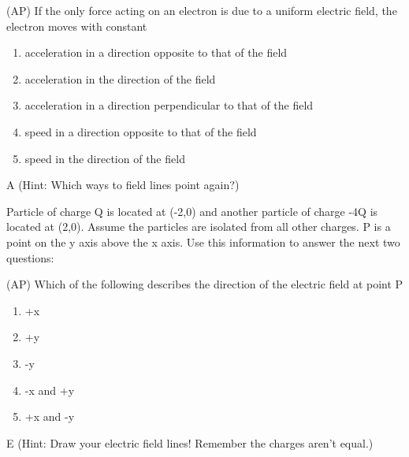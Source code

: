 \begin{question}
(AP) If the only force acting on an electron is due to a uniform electric field, the electron moves with constant
\begin{enumerate}[label=(\alph*)]
    \item acceleration in a direction opposite to that of the field
    \item acceleration in the direction of the field
    \item acceleration in a direction perpendicular to that of the field
    \item speed in a direction opposite to that of the field
    \item speed in the direction of the field
\end{enumerate}

\end{question}

\begin{solution}
A (Hint: Which ways to field lines point again?)
\end{solution}

\newpage
Particle of charge Q is located at (-2,0) and another particle of charge -4Q is located at (2,0). Assume the particles are isolated from all other charges. P is a point on the y axis above the x axis. Use this information to answer the next two questions:\\

\begin{question}
(AP) Which of the following describes the direction of the electric field at point P
\begin{multicols}{5}
\begin{enumerate}[label=(\alph*)]
    \item +x
    \item +y
    \item -y
    \item -x and +y
    \item +x and -y
\end{enumerate}
\end{multicols}

\end{question}

\begin{solution}
E (Hint: Draw your electric field lines! Remember the charges aren't equal.)
\end{solution}

